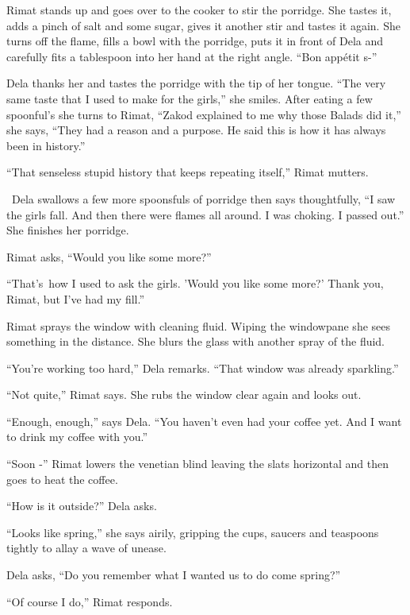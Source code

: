 \documentclass[twoside,11pt]{book}
\begin{document}
Rimat stands up and goes over to the cooker to stir the porridge. She tastes it, adds a pinch of salt and some sugar,
gives it another stir and tastes it again. She turns off the flame, fills a bowl with the porridge, puts it in front of
Dela and carefully fits a tablespoon into her hand at the right angle. ``Bon app\'etit s-''

Dela thanks her and tastes the porridge with the tip of her tongue. ``The very same taste that I used to
make for the girls,'' she smiles. After eating a few spoonful's she turns to Rimat, ``Zakod
explained to me why those Balads did it,'' she says, ``They had a reason and a purpose. He said this is how it has
always been in history.''

``That senseless stupid history that keeps repeating itself,'' Rimat mutters.

~Dela swallows a few more spoonsfuls of porridge then says thoughtfully, ``I saw the girls fall. And then
there were flames all around. I was choking. I passed out.'' She finishes her porridge.

Rimat asks, ``Would you like some more?''

``That's~how I used to ask the girls. 'Would you like some more?' Thank you, Rimat, but I've had my
fill.''

Rimat sprays the window with cleaning fluid. Wiping the windowpane she sees something{ }in the distance.
She blurs the glass with another spray of the fluid.

``You're working too hard,'' Dela remarks. ``That window was already
sparkling.''

``Not quite,'' Rimat says. She rubs the window clear again and looks out.

``Enough, enough,'' says Dela. ``You haven't even had your coffee yet.
And{ }I want to drink my coffee with you.''

``Soon -'' Rimat lowers the venetian blind leaving the slats horizontal and then goes to heat
the coffee.

``How is it outside?'' Dela asks.

``Looks like spring,'' she says airily, gripping the cups, saucers and teaspoons tightly to
allay a wave of unease.

Dela asks, ``Do you remember what I wanted us to do come spring?''

``Of course I do,'' Rimat responds.
\end{document}
